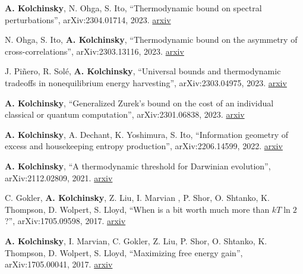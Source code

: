 
\textbf{A. Kolchinsky}, N. Ohga, S. Ito, ``Thermodynamic bound on spectral perturbations'', arXiv:2304.01714, 2023. \href{http://arxiv.org/abs/2304.01714}{arxiv}


N. Ohga, S. Ito, \textbf{A. Kolchinsky}, ``Thermodynamic bound on the asymmetry of cross-correlations'', arXiv:2303.13116, 2023. \href{http://arxiv.org/abs/2303.13116}{arxiv}

J. Piñero, R. Solé, \textbf{A. Kolchinsky}, ``Universal bounds and thermodynamic tradeoffs in nonequilibrium energy harvesting'', arXiv:2303.04975, 2023. \href{http://arxiv.org/abs/2303.04975}{arxiv}

\textbf{A. Kolchinsky}, ``Generalized Zurek's bound on the cost of an individual classical or quantum computation'', arXiv:2301.06838, 2023. \href{http://arxiv.org/abs/2301.06838}{arxiv}

\textbf{A. Kolchinsky}, A. Dechant, K. Yoshimura, S. Ito, 
``Information geometry of excess and housekeeping entropy production'', arXiv:2206.14599, 2022. \href{https://arxiv.org/abs/2206.14599}{arxiv}

\textbf{A. Kolchinsky}, ``A thermodynamic threshold for Darwinian evolution'', arXiv:2112.02809, 2021. \href{http://arxiv.org/abs/2112.02809}{arxiv} 

C. Gokler, \textbf{A. Kolchinsky}, Z. Liu, I. Marvian , P. Shor, O. Shtanko, K. Thompson, D. Wolpert, S. Lloyd, ``When is a bit worth much more than $kT \ln 2$?'', arXiv:1705.09598, 2017. \href{https://arxiv.org/abs/1705.09598}{arxiv}

\textbf{A. Kolchinsky}, I. Marvian, C. Gokler, Z. Liu, P. Shor, O. Shtanko, K. Thompson, D. Wolpert, S. Lloyd, ``Maximizing free energy gain'', arXiv:1705.00041, 2017. \href{https://arxiv.org/abs/1705.00041}{arxiv}

